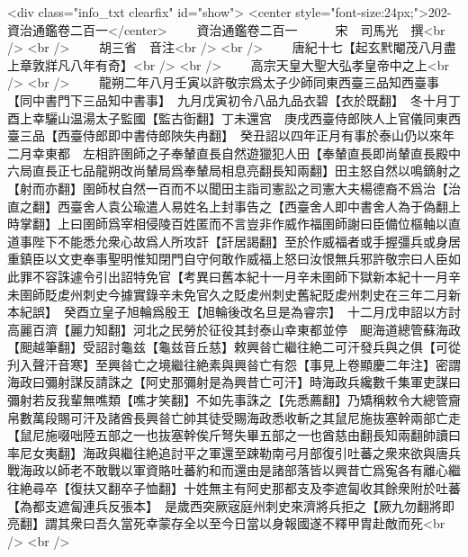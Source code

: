 <div class="info_txt clearfix" id="show">
<center style="font-size:24px;">202-資治通鑑卷二百一</center>
  　　資治通鑑卷二百一　　　宋　司馬光　撰<br />
<br />
　　胡三省　音注<br />
<br />
　　唐紀十七【起玄黓閹茂八月盡上章敦牂凡八年有奇】<br />
<br />
　　高宗天皇大聖大弘孝皇帝中之上<br />
<br />
　　龍朔二年八月壬寅以許敬宗爲太子少師同東西臺三品知西臺事【同中書門下三品知中書事】　九月戊寅初令八品九品衣碧【衣於既翻】　冬十月丁酉上幸驪山温湯太子監國【監古衘翻】丁未還宫　庚戌西臺侍郎陜人上官儀同東西臺三品【西臺侍郎即中書侍郎陜失冉翻】　癸丑詔以四年正月有事於泰山仍以來年二月幸東都　左相許圉師之子奉輦直長自然遊獵犯人田【奉輦直長即尚輦直長殿中六局直長正七品龍朔改尚輦局爲奉輦局相息亮翻長知兩翻】田主怒自然以鳴鏑射之【射而亦翻】圉師杖自然一百而不以聞田主詣司憲訟之司憲大夫楊德裔不爲治【治直之翻】西臺舍人袁公瑜遣人易姓名上封事告之【西臺舍人即中書舍人為于偽翻上時掌翻】上曰圉師爲宰相侵陵百姓匿而不言豈非作威作福圉師謝曰臣備位樞軸以直道事陛下不能悉允衆心故爲人所攻訐【訐居謁翻】至於作威福者或手握彊兵或身居重鎮臣以文吏奉事聖明惟知閉門自守何敢作威福上怒曰汝恨無兵邪許敬宗曰人臣如此罪不容誅遽令引出詔特免官【考異曰舊本紀十一月辛未圉師下獄新本紀十一月辛未圉師貶䖍州刺史今據實錄辛未免官久之貶䖍州刺史舊紀貶䖍州刺史在三年二月新本紀誤】　癸酉立皇子旭輪爲殷王【旭輪後改名旦是為睿宗】　十二月戊申詔以方討高麗百濟【麗力知翻】河北之民勞於征役其封泰山幸東都並停　䫻海道總管蘇海政【䫻越筆翻】受詔討龜兹【龜兹音丘慈】敕興㫺亡繼往絶二可汗發兵與之俱【可從刋入聲汗音寒】至興㫺亡之境繼往絶素與興㫺亡有怨【事見上卷顯慶二年注】密謂海政曰彌射謀反請誅之【阿史那彌射是為興昔亡可汗】時海政兵纔數千集軍吏謀曰彌射若反我輩無噍類【噍才笑翻】不如先事誅之【先悉薦翻】乃矯稱敕令大總管齎帛數萬段賜可汗及諸酋長興㫺亡帥其徒受賜海政悉收斬之其鼠尼施抜塞幹兩部亡走【鼠尼施啜咄陸五部之一也抜塞幹俟斤弩失畢五部之一也酋慈由翻長知兩翻帥讀曰率尼女夷翻】海政與繼往絶追討平之軍還至踈勒南弓月部復引吐蕃之衆來欲與唐兵戰海政以師老不敢戰以軍資賂吐蕃約和而還由是諸部落皆以興昔亡爲寃各有離心繼往絶尋卒【復扶又翻卒子恤翻】十姓無主有阿史那都支及李遮匐收其餘衆附於吐蕃【為都支遮匐連兵反張本】　是歲西突厥宼庭州刺史來濟將兵拒之【厥九勿翻將即亮翻】謂其衆曰吾久當死幸蒙存全以至今日當以身報國遂不釋甲胄赴敵而死<br />
<br />
